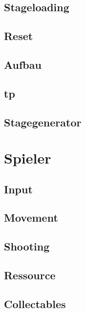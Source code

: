 \documentclass[a4paper,10pt,ngerman,fontsize=12pt]{scrreprt}
\begin{document}
\subsection{Stageloading}
\lipsum[3]


\subsection{Reset}
\lipsum[3]


\subsection{Aufbau}
\lipsum[3]


\subsection{tp}
\lipsum[3]


\subsection{Stagegenerator}
\lipsum[3]


\section{Spieler}
\lipsum[3]



\subsection{Input}
\lipsum[3]


\subsection{Movement}
\lipsum[3]


\subsection{Shooting}
\lipsum[3]


\subsection{Ressource}
\lipsum[3]


\subsection{Collectables}
\lipsum[3]
\end{document}
